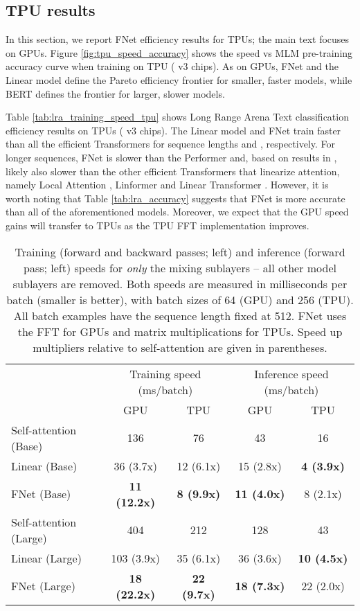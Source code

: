 \documentclass[11pt]{article}
\begin{document}
\subsection{TPU results}
\label{app:tpu}

In this section, we report FNet efficiency results for TPUs; the main text focuses on GPUs. Figure \ref{fig:tpu_speed_accuracy} shows the speed vs MLM pre-training accuracy curve when training on TPU ( v3 chips). As on GPUs, FNet and the Linear model define the Pareto efficiency frontier for smaller, faster models, while BERT defines the frontier for larger, slower models.

Table \ref{tab:lra_training_speed_tpu} shows Long Range Arena Text classification efficiency results on TPUs ( v3 chips). The Linear model and FNet train faster than all the efficient Transformers for sequence lengths  and , respectively. For longer sequences, FNet is slower than the Performer and, based on results in \citet{tay2020long}, likely also slower than the other efficient Transformers that linearize attention, namely Local Attention \citep{parmar2018image}, Linformer \citep{wang2020linformer} and Linear Transformer \citep{katharopoulos2020transformers}. However, it is worth noting that Table \ref{tab:lra_accuracy} suggests that FNet is more accurate than all of the aforementioned models. Moreover, we expect that the GPU speed gains will transfer to TPUs as the TPU FFT implementation improves.


\begin{table*}
    \caption{Training (forward and backward passes; left) and inference (forward pass; left) speeds for \emph{only} the mixing sublayers -- all other model sublayers are removed. Both speeds are measured in milliseconds per batch (smaller is better), with batch sizes of 64 (GPU) and 256 (TPU). All batch examples have the sequence length fixed at 512. FNet uses the FFT for GPUs and matrix multiplications for TPUs. Speed up multipliers relative to self-attention are given in parentheses.}
    \label{tab:mixing_speeds}
    \centering
    \begin{tabular}{l | c c | c c}
        \hline
         & \multicolumn{2}{c|}{Training speed (ms/batch)} & \multicolumn{2}{c}{Inference speed (ms/batch)} \\ 
         & GPU & TPU & GPU & TPU\\ \hline \hline
         Self-attention (Base) & 136 & 76 & 43 & 16 \\
         Linear (Base) & 36 (3.7x) & 12 (6.1x) & 15 (2.8x) & \textbf{4 (3.9x)} \\
         FNet (Base) & \textbf{11 (12.2x)} & \textbf{8 (9.9x)} & \textbf{11 (4.0x)} & 8 (2.1x) \\ \hline
         Self-attention (Large) & 404 & 212 & 128 & 43 \\
         Linear (Large) & 103 (3.9x) & 35 (6.1x) & 36 (3.6x) & \textbf{10 (4.5x)} \\
         FNet (Large) & \textbf{18 (22.2x)} & \textbf{22 (9.7x)} & \textbf{18 (7.3x)} & 22 (2.0x)\\ \hline
    \end{tabular}
\end{table*}
\end{document}
